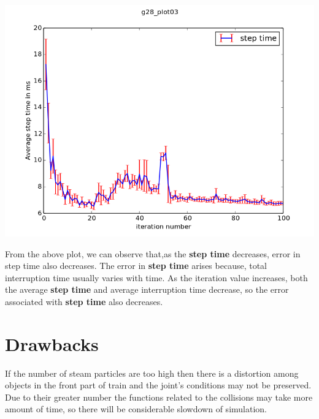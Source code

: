 \documentclass[11pt]{article}
\begin{document}
\centerline{
\includegraphics[scale = 0.5]{g28_plot03.png}
}


From the above plot, we can observe that,as the {\bf step time} decreases, error in step time also decreases. The error in {\bf step time} arises because, total interruption time usually varies with time. As the iteration value increases, both the average {\bf step time} and average interruption time decrease, so the error associated with {\bf step time}
also decreases.


\section*{Drawbacks}
If the number of steam particles are too high then there is a distortion among objects in the front part of train and the joint's conditions may not be preserved. Due to their greater number the functions related to the collisions may take more amount of time, so there will be considerable slowdown of simulation.






\end{document}
